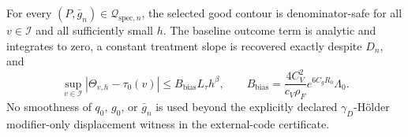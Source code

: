 For every \((P,\bar g_n)\in\mathcal Q_{\mathrm{spec},n}\), the selected good contour is denominator-safe for all \(v\in\mathcal I\) and all sufficiently small \(h\). The baseline outcome term is analytic and integrates to zero, a constant treatment slope is recovered exactly despite \(D_n\), and
\[
 \sup_{v\in\mathcal I}|\Theta_{v,h}-\tau_0(v)|
 \le B_{\mathrm{bias}}L_\tau h^\beta,
 \qquad
 B_{\mathrm{bias}}=\frac{4C_V^2}{c_V\rho_F}
 e^{6C_gR_0}\Lambda_0.
\]
No smoothness of \(q_0\), \(g_0\), or \(\bar g_n\) is used beyond the explicitly declared \(\gamma_D\)-H\"older modifier-only displacement witness in the external-code certificate.